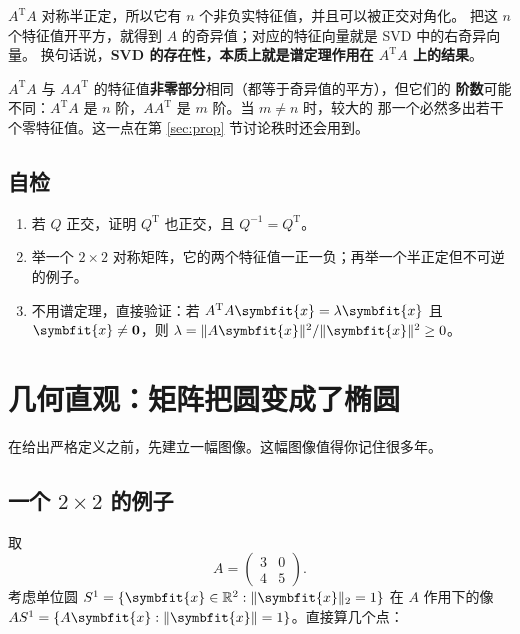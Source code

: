 \documentclass[UTF8, 11pt, a4paper, fontset=windows]{ctexart}
\theoremstyle{cnthm}
\theoremstyle{cndef}
\newcommand{\T}{^{\mathrm{T}}}
\newcommand{\R}{\mathbb{R}}
\newcommand{\nrm}[1]{\lVert #1 \rVert}
\newcommand{\x}{\symbfit{x}}
\begin{document}
\begin{keybox}[这块砖的用处]
$A\T A$ 对称半正定，所以它有 $n$ 个非负实特征值，并且可以被正交对角化。
把这 $n$ 个特征值开平方，就得到 $A$ 的奇异值；对应的特征向量就是 SVD 中的右奇异向量。
换句话说，\textbf{SVD 的存在性，本质上就是谱定理作用在 $A\T A$ 上的结果}。
\end{keybox}

\begin{warnbox}[一个容易忽略的细节]
$A\T A$ 与 $AA\T$ 的特征值\textbf{非零部分}相同（都等于奇异值的平方），但它们的
\textbf{阶数}可能不同：$A\T A$ 是 $n$ 阶，$AA\T$ 是 $m$ 阶。当 $m\neq n$ 时，较大的
那一个必然多出若干个零特征值。这一点在第 \ref{sec:prop} 节讨论秩时还会用到。
\end{warnbox}

\subsection*{自检}
\begin{enumerate}
  \item 若 $Q$ 正交，证明 $Q\T$ 也正交，且 $Q^{-1}=Q\T$。
  \item 举一个 $2\times2$ 对称矩阵，它的两个特征值一正一负；再举一个半正定但不可逆的例子。
  \item 不用谱定理，直接验证：若 $A\T A\x=\lambda\x$ 且 $\x\neq\mathbf{0}$，则
        $\lambda=\nrm{A\x}^2/\nrm{\x}^2\ge0$。
\end{enumerate}

\section{几何直观：矩阵把圆变成了椭圆}\label{sec:geom}

在给出严格定义之前，先建立一幅图像。这幅图像值得你记住很多年。

\subsection{一个 \texorpdfstring{$2\times2$}{2x2} 的例子}

取
\begin{equation}\label{eq:example-A}
  A=\begin{pmatrix}3&0\\[2pt]4&5\end{pmatrix}.
\end{equation}
考虑单位圆 $S^1=\{\x\in\R^2:\nrm{\x}_2=1\}$ 在 $A$ 作用下的像
$AS^1=\{A\x:\nrm{\x}=1\}$。直接算几个点：
\end{document}
